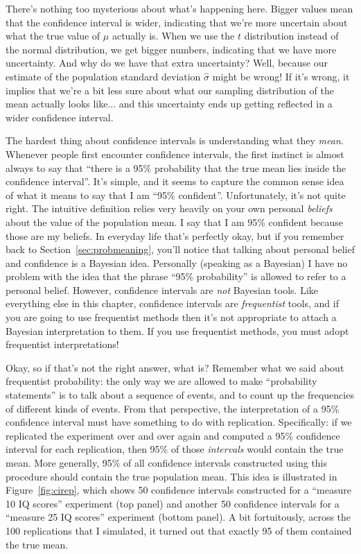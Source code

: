 There's nothing too mysterious about what's happening here. Bigger values mean that the confidence interval is wider, indicating that we're more uncertain about what the true value of $\mu$ actually is. When we use the $t$ distribution instead of the normal distribution, we get bigger numbers, indicating that we have more uncertainty. And why do we have that extra uncertainty? Well, because our estimate of the population standard deviation $\hat\sigma$ might be wrong! If it's wrong, it implies that we're a bit less sure about what our sampling distribution of the mean actually looks like... and this uncertainty ends up getting reflected in a wider confidence interval.  



The hardest thing about confidence intervals is understanding what they {\it mean}. Whenever people first encounter confidence intervals, the first instinct is almost always to say that ``there is a 95\% probability that the true mean lies inside the confidence interval''. It's simple, and it seems to capture the common sense idea of what it means to say that I am ``95\% confident''. Unfortunately, it's not quite right. The intuitive definition relies very heavily on your own personal {\it beliefs} about the value of the population mean. I say that I am 95\% confident because those are my beliefs. In everyday life that's perfectly okay, but if you remember back to Section~\ref{sec:probmeaning}, you'll notice that talking about personal belief and confidence is a Bayesian idea. Personally (speaking as a Bayesian) I have no problem with the idea that the phrase ``95\% probability'' is allowed to refer to a personal belief. However, confidence intervals are {\it not} Bayesian tools. Like everything else in this chapter, confidence intervals are {\it frequentist} tools, and if you are going to use frequentist methods then it's not appropriate to attach a Bayesian interpretation to them. If you use frequentist methods, you must adopt frequentist interpretations!

Okay, so if that's not the right answer, what is? Remember what we said about frequentist probability: the only way we are allowed to make ``probability statements'' is to talk about a sequence of events, and to count up the frequencies of different kinds of events. From that perspective, the interpretation of a 95\% confidence interval must have something to do with replication. Specifically: if we replicated the experiment over and over again and computed a 95\% confidence interval for each replication, then 95\% of those {\it intervals} would contain the true mean. More generally, 95\% of all confidence intervals constructed using this procedure should contain the true population mean. This idea is illustrated in Figure~\ref{fig:cirep}, which shows 50 confidence intervals constructed for a ``measure 10 IQ scores'' experiment (top panel) and another 50 confidence intervals for a ``measure 25 IQ scores'' experiment (bottom panel). A bit fortuitously, across the 100 replications that I simulated, it turned out that exactly 95 of them contained the true mean. 



